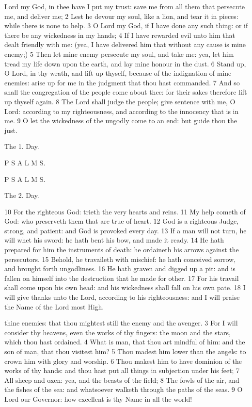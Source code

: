 Lord my God, in thee have I put my trust: save me from all them that persecute me, and deliver me; 2 Lest he devour my soul, like a lion, and tear it in pieces: while there is none to help. 3 O Lord my God, if I have done any such thing: or if there be any wickedness in my hands; 4 If I have rewarded evil unto him that dealt friendly with me: (yea, I have delivered him that without any cause is mine enemy;) 5 Then let mine enemy persecute my soul, and take me: yea, let him tread my life down upon the earth, and lay mine honour in the dust. 6 Stand up, O Lord, in thy wrath, and lift up thyself, because of the indignation of mine enemies: arise up for me in the judgment that thou hast commanded. 7 And so shall the congregation of the people come about thee: for their sakes therefore lift up thyself again. 8 The Lord shall judge the people; give sentence with me, O Lord: according to my righteousness, and according to the innocency that is in me. 9 O let the wickedness of the ungodly come to an end: but guide thou the just.

The 1. Day.

P S A L M S.

P S A L M S.

The 2. Day.

10 For the righteous God: trieth the very hearts and reins. 11 My help cometh of God: who preserveth them that are true of heart. 12 God is a righteous Judge, strong, and patient: and God is provoked every day. 13 If a man will not turn, he will whet his sword: he hath bent his bow, and made it ready. 14 He hath prepared for him the instruments of death: he ordaineth his arrows against the persecutors. 15 Behold, he travaileth with mischief: he hath conceived sorrow, and brought forth ungodliness. 16 He hath graven and digged up a pit: and is fallen on himself into the destruction that he made for other. 17 For his travail shall come upon his own head: and his wickedness shall fall on his own pate. 18 I will give thanks unto the Lord, according to his righteousness: and I will praise the Name of the Lord most High.

thine enemies: that thou mightest still the enemy and the avenger. 3 For I will consider thy heavens, even the works of thy fingers: the moon and the stars, which thou hast ordained. 4 What is man, that thou art mindful of him: and the son of man, that thou visitest him? 5 Thou madest him lower than the angels: to crown him with glory and worship. 6 Thou makest him to have dominion of the works of thy hands: and thou hast put all things in subjection under his feet; 7 All sheep and oxen: yea, and the beasts of the field; 8 The fowls of the air, and the fishes of the sea: and whatsoever walketh through the paths of the seas. 9 O Lord our Governor: how excellent is thy Name in all the world!

